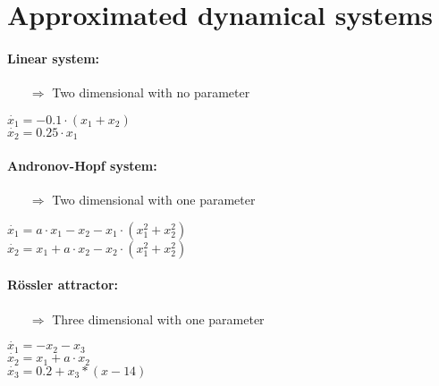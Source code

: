 \section{Approximated dynamical systems}

\begin{frame}
	\paragraph{Linear system:}\vspace{-2mm}
	\begin{itemize}
		\item[$\Rightarrow$] Two dimensional with no parameter
	\end{itemize}\vspace{-3mm}
	\quad\quad $\dot{x_1} = -0.1 \cdot (x_1 + x_2)$\\
	\quad\quad $\dot{x_2} = 0.25 \cdot x_1$\\
	\vspace{4mm}
	
	\paragraph{Andronov-Hopf system:}\vspace{-2mm}
	\begin{itemize}
		\item[$\Rightarrow$] Two dimensional with one parameter
	\end{itemize}\vspace{-3mm}
	\quad\quad $\dot{x_1} = a \cdot x_1 - x_2 - x_1 \cdot (x_1^2 + x_2^2)$\\
	\quad\quad $\dot{x_2} = x_1 + a \cdot x_2 - x_2 \cdot (x_1^2 + x_2^2)$\\
	\vspace{4mm}
	
	\paragraph{R\"ossler attractor:}\vspace{-2mm}
	\begin{itemize}
		\item[$\Rightarrow$] Three dimensional with one parameter
	\end{itemize}\vspace{-3mm}
	\quad\quad $\dot{x_1} = -x_2 - x_3$\\
	\quad\quad $\dot{x_2} = x_1 + a \cdot x_2$\\
	\quad\quad $\dot{x_3} = 0.2 + x_3 * (x - 14)$
	\vspace{4mm}
\end{frame}